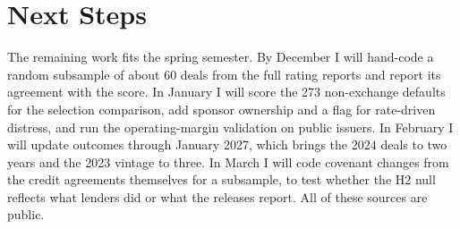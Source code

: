 \documentclass[12pt]{article}
\begin{document}
\section{Next Steps}
\label{sec:next}

The remaining work fits the spring semester. By December I will hand-code a random subsample of about 60 deals from the full rating reports and report its agreement with the score. In January I will score the 273 non-exchange defaults for the selection comparison, add sponsor ownership and a flag for rate-driven distress, and run the operating-margin validation on public issuers. In February I will update outcomes through January 2027, which brings the 2024 deals to two years and the 2023 vintage to three. In March I will code covenant changes from the credit agreements themselves for a subsample, to test whether the H2 null reflects what lenders did or what the releases report. All of these sources are public.

\newpage
\singlespacing

\end{document}
